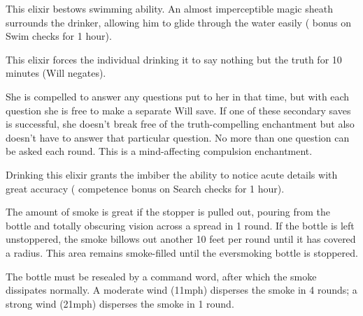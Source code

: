{

 This elixir bestows swimming ability. An almost imperceptible magic sheath surrounds the drinker, allowing him to glide through the water easily (  bonus on Swim checks for 1 hour).


 This elixir forces the individual drinking it to say nothing but the truth for 10 minutes (Will negates).

She is compelled to answer any questions put to her in that time, but with each question she is free to make a separate Will save. If one of these secondary saves is successful, she doesn't break free of the truth-compelling enchantment but also doesn't have to answer that particular question. No more than one question can be asked each round. This is a mind-affecting compulsion enchantment.


 Drinking this elixir grants the imbiber the ability to notice acute details with great accuracy ( competence bonus on Search checks for 1 hour).


  The amount of smoke is great if the stopper is pulled out, pouring from the bottle and totally obscuring vision across a  spread in 1 round. If the bottle is left unstoppered, the smoke billows out another 10 feet per round until it has covered a  radius. This area remains smoke-filled until the eversmoking bottle is stoppered.

The bottle must be resealed by a command word, after which the smoke dissipates normally. A moderate wind (11\plus mph) disperses the smoke in 4 rounds; a strong wind (21\plus mph) disperses the smoke in 1 round.

}
